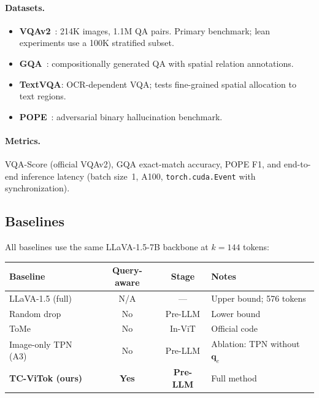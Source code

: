 \documentclass[11pt,a4paper]{article}
\newcommand{\vq}{\mathbf{q}}
\begin{document}
\paragraph{Datasets.}
\begin{itemize}[leftmargin=2em, itemsep=1pt]
  \item \textbf{VQAv2}~\citep{goyal2017vqa}: 214K images, 1.1M QA pairs.
    Primary benchmark; lean experiments use a 100K stratified subset.
  \item \textbf{GQA}~\citep{hudson2019gqa}: compositionally generated QA
    with spatial relation annotations.
  \item \textbf{TextVQA}: OCR-dependent VQA; tests fine-grained spatial
    allocation to text regions.
  \item \textbf{POPE}~\citep{pope}: adversarial binary hallucination benchmark.
\end{itemize}

\paragraph{Metrics.} VQA-Score (official VQAv2), GQA exact-match accuracy,
POPE F1, and end-to-end inference latency (batch size~1, A100,
\texttt{torch.cuda.Event} with synchronization).

\subsection{Baselines}

All baselines use the same LLaVA-1.5-7B backbone at $k{=}144$ tokens:

\begin{center}
\renewcommand{\arraystretch}{1.15}
\begin{tabular}{@{}lccl@{}}
  \toprule
  Baseline & Query-aware & Stage & Notes \\
  \midrule
  LLaVA-1.5 (full)          & N/A & ---       & Upper bound; 576 tokens \\
  Random drop                & No  & Pre-LLM   & Lower bound \\
  ToMe~\citep{bolya2022token}& No  & In-ViT    & Official code \\
  Image-only TPN (A3)        & No  & Pre-LLM   & Ablation: TPN without $\vq_e$ \\
  \textbf{TC-ViTok (ours)}   & \textbf{Yes} & \textbf{Pre-LLM} & Full method \\
  \bottomrule
\end{tabular}
\end{center}
\end{document}
